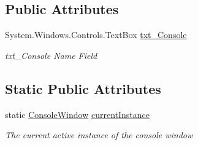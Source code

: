 \subsection*{Public Attributes}
\begin{DoxyCompactItemize}
\item 
System.\+Windows.\+Controls.\+Text\+Box \hyperlink{class_c_p_u___o_s___simulator_1_1_console_window_ad1d4a0c5f573c7e89c8d6ed57d5097e0}{txt\+\_\+\+Console}
\begin{DoxyCompactList}\small\item\em txt\+\_\+\+Console Name Field \end{DoxyCompactList}\end{DoxyCompactItemize}
\subsection*{Static Public Attributes}
\begin{DoxyCompactItemize}
\item 
static \hyperlink{class_c_p_u___o_s___simulator_1_1_console_window}{Console\+Window} \hyperlink{class_c_p_u___o_s___simulator_1_1_console_window_abee2fd1e118dd4f81dc2142bc033da4a}{current\+Instance}
\begin{DoxyCompactList}\small\item\em The current active instance of the console window \end{DoxyCompactList}\end{DoxyCompactItemize}
